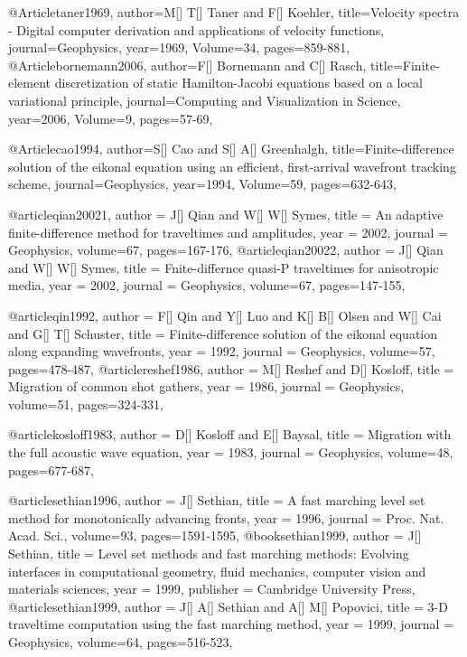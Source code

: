 @Article{taner1969,
  author={M[] T[] Taner and F[] Koehler},
  title={Velocity spectra - Digital computer derivation and applications of velocity functions},
  journal={Geophysics},
  year=1969,
  Volume=34,
  pages={859-881},
}
@Article{bornemann2006,
  author={F[] Bornemann and C[] Rasch},
  title={Finite-element discretization of static Hamilton-Jacobi equations based on a local variational principle},
  journal={Computing and Visualization in Science},
  year=2006,
  Volume=9,
  pages={57-69},
}

@Article{cao1994,
  author={S[] Cao and S[] A[] Greenhalgh},
  title={Finite-difference solution of the eikonal equation using an efficient, first-arrival wavefront tracking scheme},
  journal={Geophysics},
  year=1994,
  Volume=59,
  pages={632-643},
}

@article{qian20021,
  author =	 {J[] Qian and W[] W[] Symes},
  title =	 {An adaptive finite-difference method for traveltimes and amplitudes},
  year =	 2002,
  journal =	 {Geophysics},
  volume={67},
 pages=167-176,
}
@article{qian20022,
  author =	 {J[] Qian and W[] W[] Symes},
  title =	 {Fnite-differnce quasi-P traveltimes for anisotropic media},
  year =	 2002,
  journal =	 {Geophysics},
  volume={67},
 pages=147-155,
}

@article{qin1992,
  author =	 {F[] Qin and Y[] Luo and K[] B[] Olsen and W[] Cai and G[] T[] Schuster},
  title =	 {Finite-difference solution of the eikonal equation along expanding wavefronts},
  year =	 1992,
  journal =	 {Geophysics},
  volume={57},
 pages=478-487,
}
@article{reshef1986,
  author =	 {M[] Reshef and D[] Kosloff},
  title =	 {Migration of common shot gathers},
  year =	 1986,
  journal =	 {Geophysics},
  volume={51},
 pages=324-331,
}

@article{kosloff1983,
  author =	 {D[] Kosloff and E[] Baysal},
  title =	 {Migration with the full acoustic wave equation},
  year =	 1983,
  journal =	 {Geophysics},
  volume={48},
 pages=677-687,
}

@article{sethian1996,
  author =	 {J[] Sethian},
  title =	 {A fast marching level set method for monotonically advancing fronts},
  year =	 1996,
  journal =	 {Proc. Nat. Acad. Sci.},
  volume={93},
 pages=1591-1595,
}
@book{sethian1999,
  author =	 {J[] Sethian},
  title =	 {Level set methods and fast marching methods: Evolving interfaces in computational geometry, fluid mechanics, computer vision and materials sciences},
  year =	 1999,
  publisher =	 {Cambridge University Press},
}
@article{sethian1999,
  author =	 {J[] A[] Sethian and A[] M[] Popovici},
  title =	 {3-D traveltime computation using the fast marching method},
  year =	 1999,
  journal =	 {Geophysics},
  volume={64},
 pages=516-523,
}

